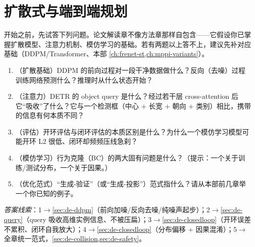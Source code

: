 \chapter{扩散式与端到端规划}
\label{ch:diffusion-e2e}



\begin{practice}[前置自测]
开始之前，先试答下列问题。论文解读章不像方法章那样自包含——它假设你已掌握扩散模型、注意力机制、模仿学习的基础。若有两题以上答不上，建议先补对应基础（DDPM/Transformer、本部 \cref{ch:frenet-st,ch:mppi-variants}）。
\begin{enumerate}
  \item （扩散基础）DDPM 的前向过程对一段干净数据做什么？反向（去噪）过程训练网络预测什么？推理时从什么状态开始？
  \item （注意力）DETR 的 object query 是什么？经过若干层 cross-attention 后它“吸收”了什么？它与一个检测框（中心 $+$ 长宽 $+$ 朝向 $+$ 类别）相比，携带的信息有何本质不同？
  \item （评估）开环评估与闭环评估的本质区别是什么？为什么一个模仿学习模型可能开环 L2 很低、闭环却频频压线急刹？
  \item （模仿学习）行为克隆（BC）的两大固有问题是什么？（提示：一个关于训练/测试分布，一个关于因果。）
  \item （优化范式）“生成-验证”（或“生成-投影”）范式指什么？请从本部前几章举一个你已知的例子。
\end{enumerate}
\noindent\emph{答案线索}：1$\to$\cref{sec:de-ddpm}（前向加噪/反向去噪/纯噪声起步）；2$\to$\cref{sec:de-query}（query 吸收高维实例信息、不被压扁）；3$\to$\cref{sec:de-closedloop}（开环误差不累积、闭环自我放大）；4$\to$\cref{sec:de-closedloop}（分布偏移 $+$ 因果混淆）；5$\to$全章统一范式，\cref{sec:de-collision,sec:de-safety}。
\end{practice}

